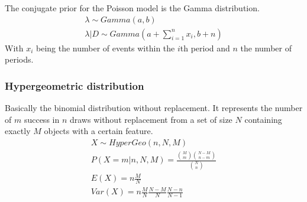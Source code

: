 The conjugate prior for the Poisson model is the Gamma distribution.
\begin{gather*}
\lambda \sim Gamma(a, b)\\
\lambda|D \sim Gamma(a+\sum_{i=1}^{n}x_i, b+n)
\end{gather*}
With $x_i$ being the number of events within the $i$th period and $n$ the number of periods.

\subsubsection{Hypergeometric distribution}
Basically the binomial distribution without replacement. It represents the number of $m$ success in $n$ draws without replacement from a set of size $N$ containing exactly $M$ objects with a certain feature.
\begin{gather*}
X\sim HyperGeo(n,N,M)\\
P(X=m|n, N, M) = \frac{{{M}\choose{m}}{{N-M}\choose{n-m}}}{{N\choose n}}\\
E(X) = n\frac{M}{N}\\
Var(X) = n\frac{M}{N}\frac{N-M}{N}\frac{N-n}{N-1}
\end{gather*}
